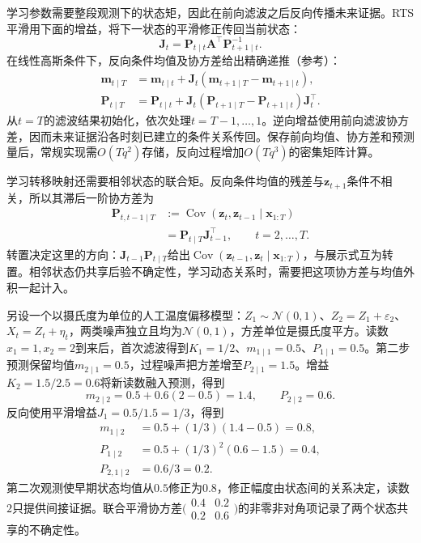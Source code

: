 学习参数需要整段观测下的状态矩，因此在前向滤波之后反向传播未来证据。RTS平滑用下面的增益，将下一状态的平滑修正传回当前状态：
\[
  \bm{J}_t=\bm{P}_{t\mid t}\bm{A}^{\top}
    \bm{P}_{t+1\mid t}^{-1}.
\]
在线性高斯条件下，反向条件均值及协方差给出精确递推（参考）：
\begin{equation}
  \begin{aligned}
    \bm{m}_{t\mid T}
      &=\bm{m}_{t\mid t}
        +\bm{J}_t(\bm{m}_{t+1\mid T}
          -\bm{m}_{t+1\mid t}),\\
    \bm{P}_{t\mid T}
      &=\bm{P}_{t\mid t}
        +\bm{J}_t(\bm{P}_{t+1\mid T}
          -\bm{P}_{t+1\mid t})\bm{J}_t^\top.
  \end{aligned}
  \label{eq:pgm-dynamic-rts}
\end{equation}
从$t=T$的滤波结果初始化，依次处理$t=T-1,\ldots,1$。逆向增益使用前向滤波协方差，因而未来证据沿各时刻已建立的条件关系传回。保存前向均值、协方差和预测量后，常规实现需$O(Tq^2)$存储，反向过程增加$O(Tq^3)$的密集矩阵计算。

学习转移映射还需要相邻状态的联合矩。反向条件均值的残差与$\bm{z}_{t+1}$条件不相关，所以其滞后一阶协方差为
\begin{equation}
  \begin{aligned}
    \bm{P}_{t,t-1\mid T}
      &:=\operatorname{Cov}(\bm{z}_t,\bm{z}_{t-1}
        \mid\bm{x}_{1:T})\\
      &=\bm{P}_{t\mid T}\bm{J}_{t-1}^{\top},
      \qquad t=2,\ldots,T.
  \end{aligned}
  \label{eq:pgm-dynamic-lag-covariance}
\end{equation}
转置决定这里的方向：$\bm{J}_{t-1}\bm{P}_{t\mid T}$给出$\operatorname{Cov}(\bm{z}_{t-1},\bm{z}_{t}\mid\bm{x}_{1:T})$，与展示式互为转置。相邻状态仍共享后验不确定性，学习动态关系时，需要把这项协方差与均值外积一起计入。

\begin{example}
  \label{ex:pgm-dynamic-kalman}
  另设一个以摄氏度为单位的人工温度偏移模型：$Z_1\sim\mathcal{N}(0,1)$、$Z_2=Z_1+\varepsilon_2$、$X_t=Z_t+\eta_t$，两类噪声独立且均为$\mathcal{N}(0,1)$，方差单位是摄氏度平方。读数$x_1=1,x_2=2$到来后，首次滤波得到$K_1=1/2$、$m_{1\mid1}=0.5$、$P_{1\mid1}=0.5$。第二步预测保留均值$m_{2\mid1}=0.5$，过程噪声把方差增至$P_{2\mid1}=1.5$。增益$K_2=1.5/2.5=0.6$将新读数融入预测，得到
  \[
    m_{2\mid2}=0.5+0.6(2-0.5)=1.4,\qquad
    P_{2\mid2}=0.6.
  \]
  反向使用平滑增益$J_1=0.5/1.5=1/3$，得到
  \[
    \begin{aligned}
      m_{1\mid2}&=0.5+(1/3)(1.4-0.5)=0.8,\\
      P_{1\mid2}&=0.5+(1/3)^2(0.6-1.5)=0.4,\\
      P_{2,1\mid2}&=0.6/3=0.2.
    \end{aligned}
  \]
  第二次观测使早期状态均值从$0.5$修正为$0.8$，修正幅度由状态间的关系决定，读数$2$只提供间接证据。联合平滑协方差$\bigl(\begin{smallmatrix}0.4&0.2\\0.2&0.6\end{smallmatrix}\bigr)$的非零非对角项记录了两个状态共享的不确定性。
\end{example}

